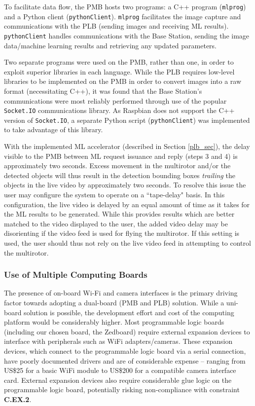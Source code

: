 To facilitate data flow, the PMB hosts two programs: a C++ program (\texttt{mlprog}) and a Python client (\texttt{pythonClient}). \texttt{mlprog} facilitates the image capture and communications with the PLB (sending images and receiving ML results). \texttt{pythonClient} handles communications with the Base Station, sending the image data/machine learning results and retrieving any updated parameters. 

Two separate programs were used on the PMB, rather than one, in order to exploit superior libraries in each language. While the PLB requires low-level libraries to be implemented on the PMB in order to convert images into a raw format (necessitating C++), it was found that the Base Station's communications were most reliably performed through use of the popular \texttt{Socket.IO} communications library. As Raspbian does not support the C++ version of \texttt{Socket.IO}, a separate Python script (\texttt{pythonClient}) was implemented to take advantage of this library.

With the implemented ML accelerator (described in Section \ref{plb_sec}), the delay visible to the PMB between ML request issuance and reply (steps 3 and 4) is approximately two seconds. Excess movement in the multirotor and/or the detected objects will thus result in the detection bounding boxes \textit{trailing} the objects in the live video by approximately two seconds. To resolve this issue the user may configure the system to operate on a ``tape-delay" basis. In this configuration, the live video is delayed by an equal amount of time as it takes for the ML results to be generated. While this provides results which are better matched to the video displayed to the user, the added video delay may be disorienting if the video feed is used for flying the multirotor. If this setting is used, the user should thus not rely on the live video feed in attempting to control the multirotor.

\subsubsection{Use of Multiple Computing Boards}
The presence of on-board Wi-Fi and camera interfaces is the primary driving factor towards adopting a dual-board (PMB and PLB) solution. While a uni-board solution is possible, the development effort and cost of the computing platform would be considerably higher. Most programmable logic boards (including our chosen board, the Zedboard) require external expansion devices to interface with peripherals such as WiFi adapters/cameras. These expansion devices, which connect to the programmable logic board via a serial connection, have poorly documented drivers and are of considerable expense -- ranging from US\$25 for a basic WiFi module\cite{digiwifi} to US\$200 for a compatible camera interface card\cite{digipmod}. External expansion devices also require considerable glue logic on the programmable logic board, potentially risking non-compliance with constraint \textbf{C.EX.2}.

